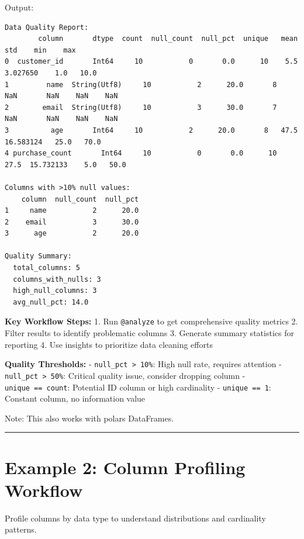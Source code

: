 \documentclass[
  letterpaper,
]{scrbook}
\begin{document}
Output:

\begin{verbatim}
Data Quality Report:
        column       dtype  count  null_count  null_pct  unique   mean       std    min    max
0  customer_id       Int64     10           0       0.0      10    5.5  3.027650    1.0   10.0
1         name  String(Utf8)     10           2      20.0       8    NaN       NaN    NaN    NaN
2        email  String(Utf8)     10           3      30.0       7    NaN       NaN    NaN    NaN
3          age       Int64     10           2      20.0       8   47.5  16.583124   25.0   70.0
4 purchase_count       Int64     10           0       0.0      10   27.5  15.732133    5.0   50.0

Columns with >10% null values:
    column  null_count  null_pct
1     name           2      20.0
2    email           3      30.0
3      age           2      20.0

Quality Summary:
  total_columns: 5
  columns_with_nulls: 3
  high_null_columns: 3
  avg_null_pct: 14.0
\end{verbatim}

\textbf{Key Workflow Steps:} 1. Run \texttt{@analyze} to get
comprehensive quality metrics 2. Filter results to identify problematic
columns 3. Generate summary statistics for reporting 4. Use insights to
prioritize data cleaning efforts

\textbf{Quality Thresholds:} - \texttt{null\_pct\ \textgreater{}\ 10\%}:
High null rate, requires attention -
\texttt{null\_pct\ \textgreater{}\ 50\%}: Critical quality issue,
consider dropping column - \texttt{unique\ ==\ count}: Potential ID
column or high cardinality - \texttt{unique\ ==\ 1}: Constant column, no
information value

Note: This also works with polars DataFrames.

\begin{center}\rule{0.5\linewidth}{0.5pt}\end{center}

\section{Example 2: Column Profiling
Workflow}\label{example-2-column-profiling-workflow}

Profile columns by data type to understand distributions and cardinality
patterns.
\end{document}
